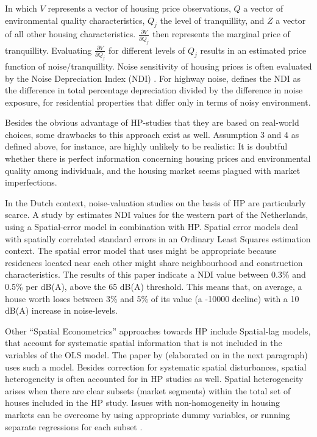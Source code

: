 \documentclass[a4paper]{scrartcl}
\begin{document}
In which $V$ represents a vector of housing price observations, $Q$ a vector of environmental quality characteristics, $Q_j$ the level of tranquillity, and $Z$ a vector of all other housing characteristics. $\frac{\partial V}{\partial Q_j }$ then represents the marginal price of tranquillity. Evaluating  $\frac{\partial V}{\partial Q_j }$ for different levels of $Q_j$ results in an estimated price function of noise/tranquillity. Noise sensitivity of housing prices is often evaluated by the Noise Depreciation Index (NDI) \citep{Walters1975}. For highway noise, \cite{Nelson1982} defines the NDI as the difference in total percentage depreciation divided by the difference in noise exposure, for residential properties that differ only in terms of noisy environment.	

Besides the obvious advantage of HP-studies that they are based on real-world choices, some drawbacks to this approach exist as well. Assumption 3 and 4 as defined above, for instance, are highly unlikely to be realistic: It is doubtful whether there is perfect information concerning housing prices and environmental quality among individuals, and the housing market seems plagued with market imperfections.

In the Dutch context, noise-valuation studies on the basis of HP are particularly scarce. A study by \cite{Theebe2004} estimates NDI values for the western part of the Netherlands, using a Spatial-error model in combination with HP. Spatial error models deal with spatially correlated standard errors in an Ordinary Least Squares estimation context. The spatial error model that \cite{Theebe2004} uses might be appropriate because residences located near each other might share neighbourhood and construction characteristics. The results of this paper indicate a NDI value between 0.3\% and 0.5\% per dB(A), above the 65 dB(A) threshold. This means that, on average, a house worth  loses between 3\% and 5\% of its value (a -10000 decline) with a 10 dB(A) increase in noise-levels. 

Other “Spatial Econometrics” approaches towards HP include Spatial-lag models, that account for systematic spatial information that is not included in the variables of the OLS model. The paper by \cite{Pope2008} (elaborated on in the next paragraph) uses such a model. Besides correction for systematic spatial disturbances, spatial heterogeneity is often accounted for in HP studies as well. Spatial heterogeneity arises when there are clear subsets (market segments) within the total set of houses included in the HP study. Issues with non-homogeneity in housing markets can be overcome by using appropriate dummy variables, or running separate regressions for each subset \citep{Nelson2008}. 
\end{document}
